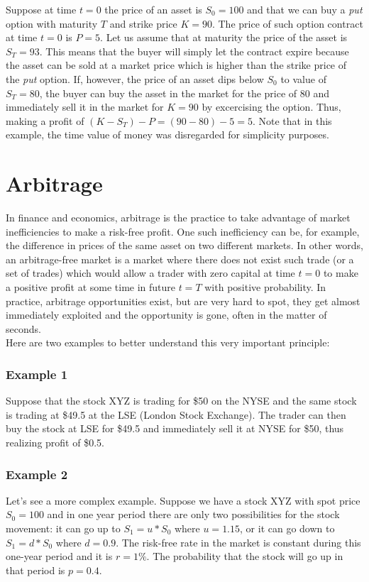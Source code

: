 \documentclass[times, utf8, diplomski]{fer}
\begin{document}
\hfill \break
\noindent Suppose at time $t=0$ the price of an asset is $S_0 = 100$ and that we can buy a \textit{put} option with maturity $T$ and strike price $K=90$. The price of such option contract at time $t=0$ is $P = 5$. Let us assume that at maturity the price of the asset is $S_T = 93$. This means that the buyer will simply let the contract expire because the asset can be sold at a market price which is higher than the strike price of the \textit{put} option. If, however, the price of an asset dips below $S_0$ to value of $S_T = 80$, the buyer can buy the asset in the market for the price of $80$ and immediately sell it in the market for $K=90$ by excercising the option. Thus, making a profit of $(K-S_T) - P = (90 - 80) - 5 = 5$. 
\hfill \break
Note that in this example, the time value of money was disregarded for simplicity purposes. 

\section{Arbitrage}
In finance and economics, arbitrage is the practice to take advantage of market inefficiencies to make a risk-free profit. One such inefficiency can be, for example, the difference in prices of the same asset on two different markets. In other words, an arbitrage-free market is a market where there does not exist such trade (or a set of trades) which would allow a trader with zero capital at time $t=0$ to make a positive profit at some time in future $t=T$ with positive probability. In practice, arbitrage opportunities exist, but are very hard to spot, they get almost immediately exploited and the opportunity is gone, often in the matter of seconds.\\Here are two examples to better understand this very important principle:
\subsubsection{Example 1}
Suppose that the stock XYZ is trading for \$50 on the NYSE and the same stock is trading at \$49.5 at the LSE (London Stock Exchange). The trader can then buy the stock at LSE for \$49.5 and immediately sell it at NYSE for \$50, thus realizing profit of \$0.5. 
\subsubsection{Example 2}
Let's see a more complex example. Suppose we have a stock XYZ with spot price $S_0 = 100$ and in one year period there are only two possibilities for the stock movement: it can go up to $S_1 = u * S_0$ where $u=1.15$, or it can go down to $S_1 = d * S_0$ where $d=0.9$. The risk-free rate in the market is constant during this one-year period and it is $r=1\%$. The probability that the stock will go up in that period is $p=0.4$. 
\end{document}
